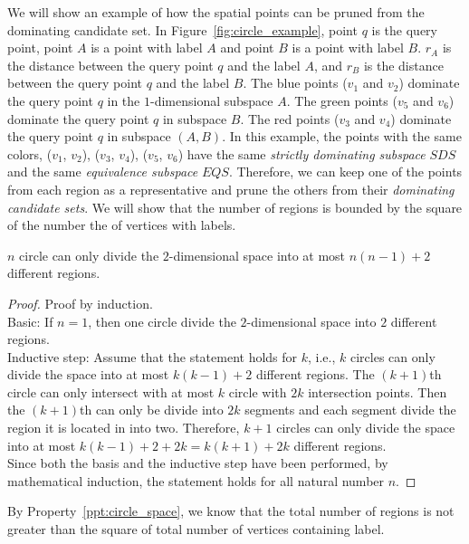 We will show an example of how the spatial points can be pruned from the dominating candidate set. In Figure~\ref{fig:circle_example}, point $q$ is the query point, point $A$ is a point with label $A$ and point $B$ is a point with label $B$. $r_{A}$ is the distance between the query point $q$ and the label $A$, and $r_{B}$ is the distance between the query point $q$ and the label $B$. The blue points ($v_1$ and $v_2$) dominate the query point $q$ in the $1$-dimensional subspace $A$. The green points ($v_5$ and $v_6$) dominate the query point $q$ in subspace $B$. The red points ($v_3$ and $v_4$) dominate the query point $q$ in subspace $(A, B)$. In this example, the points with the same colors, ($v_1$, $v_2$), ($v_3$, $v_4$), ($v_5$, $v_6$) have the same \emph{strictly dominating subspace} $\mathit{SDS}$ and the same \emph{equivalence subspace} $\mathit{EQS}$. Therefore, we can keep one of the points from each region as a representative and prune the others from their \emph{dominating candidate sets}. We will show that the number of regions is bounded by the square of the number the of vertices with labels.

\begin{property}
\label{ppt:circle_space}
$n$ circle can only divide the $2$-dimensional space into at most $n(n-1)+2$ different regions.
\end{property}

\begin{proof}
Proof by induction.\\
Basic: If $n=1$, then one circle divide the $2$-dimensional space into $2$ different regions.\\
Inductive step: Assume that the statement holds for $k$, i.e., $k$ circles can only divide the space into at most $k(k-1)+2$ different regions. The $(k+1)$th circle can only intersect with at most $k$ circle with $2k$ intersection points. Then the $(k+1)$th can only be divide into $2k$ segments and each segment divide the region it is located in into two. Therefore, $k+1$ circles can only divide the space into at most $k(k-1)+2+2k = k(k+1)+2k$ different regions.\\
Since both the basis and the inductive step have been performed, by mathematical induction, the statement holds for all natural number $n$.
\end{proof}

By Property~\ref{ppt:circle_space}, we know that the total number of regions is not greater than the square of total number of vertices containing label. 

